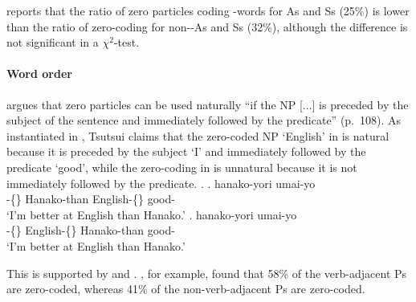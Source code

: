  reports that
the ratio of zero particles coding -words for As and Ss (25\%) is lower than the ratio of zero-coding for non--As and Ss (32\%),
although the difference is not significant in a $\chi^{2}$-test.



\paragraph{Word order}

 argues that
zero particles can be used naturally
``if the NP [...] is preceded by the subject of the sentence and immediately followed by the predicate'' (p.~108).
As instantiated in \Next,
Tsutsui claims that the zero-coded NP  `English' in \Next[a] is natural
because it is preceded by the subject  `I' and immediately followed by the predicate  `good',
while the zero-coding in \Next[b] is unnatural because
it is not immediately followed by the predicate.
%
\ex.
 \ag.  hanako-yori  umai-yo \\
      -\{\} Hanako-than English-\{\} good- \\
      `I'm better at English than Hanako.'
 \bg.   hanako-yori umai-yo \\
      -\{\} English-\{\} Hanako-than good- \\
      `I'm better at English than Hanako.'
      \hfill{\cite[p.~110]{tsutsui84}}

This is supported by  and .
, for example, found that
58\% of the verb-adjacent Ps are zero-coded,
whereas 41\% of the non-verb-adjacent Ps are zero-coded.

